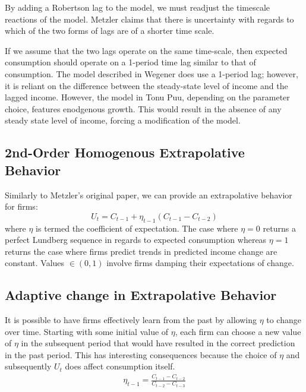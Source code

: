 \documentclass[]{article}
\begin{document}
By adding a Robertson lag to the model, we must readjust the timescale reactions of the model. Metzler claims that there is uncertainty with regards to which of the two forms of lags are of a shorter time scale. 

If we assume that the two lags operate on the same time-scale, then expected consumption should operate on a 1-period time lag similar to that of consumption. The model described in Wegener does use a 1-period lag; however, it is reliant on the difference between the steady-state level of income and the lagged income. However, the model in Tonu Puu, depending on the parameter choice, features enodgenous growth. This would result in the absence of any steady state level of income, forcing a modification of the model.
\subsection*{2nd-Order Homogenous Extrapolative Behavior}
Similarly to Metzler's original paper, we can provide an extrapolative behavior for firms:
\begin{equation}
	U_t=C_{t-1}+\eta_{t-1}(C_{t-1}-C_{t-2})
\end{equation}
where $\eta$ is termed the coefficient of expectation. The case where $\eta=0$ returns a perfect Lundberg sequence in regards to expected consumption whereas $\eta=1$ returns the case where firms predict trends in predicted income change are constant. Values $\in(0,1)$ involve firms damping their expectations of change. 
\subsection*{Adaptive change in Extrapolative Behavior}
It is possible to have firms effectively learn from the past by allowing $\eta$ to change over time. Starting with some initial value of $\eta$, each firm can choose a new value of $\eta$ in the subsequent period that would have resulted in the correct prediction in the past period. This has interesting consequences because the choice of $\eta$ and subsequently $U_t$ does affect consumption itself. 
\begin{gather}
	\eta_{t-1} = \frac{C_{t-1}-C_{t-2}}{C_{t-2}-C_{t-3}}
\end{gather}
\end{document}
